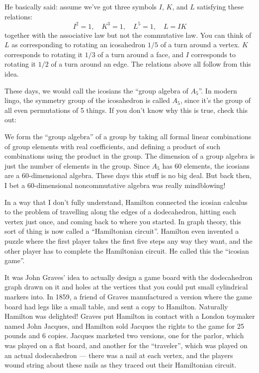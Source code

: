 \documentclass{article}
\def\tightlist{}
\renewcommand{\texttt}[1]{%
  \begingroup
  \ttfamily
  \begingroup\lccode`~=`/\lowercase{\endgroup\def~}{/\discretionary{}{}{}}%
  \begingroup\lccode`~=`[\lowercase{\endgroup\def~}{[\discretionary{}{}{}}%
  \begingroup\lccode`~=`.\lowercase{\endgroup\def~}{.\discretionary{}{}{}}%
  \catcode`/=\active\catcode`[=\active\catcode`.=\active
  \scantokens{#1\noexpand}%
  \endgroup
}
\begin{document}
He basically said: assume we've got three symbols \(I\), \(K\), and
\(L\) satisfying these relations:
\[I^2 = 1,\quad K^3 = 1,\quad L^5 = 1,\quad L = IK \] together with the
associative law but not the commutative law. You can think of \(L\) as
corresponding to rotating an icosahedron \(1/5\) of a turn around a
vertex. \(K\) corresponds to rotating it \(1/3\) of a turn around a
face, and \(I\) corresponds to rotating it \(1/2\) of a turn around an
edge. The relations above all follow from this idea.

These days, we would call the icosians the ``group algebra of \(A_5\)''.
In modern lingo, the symmetry group of the icosahedron is called
\(A_5\), since it's the group of all even permutations of 5 things. If
you don't know why this is true, check this out:


We form the ``group algebra'' of a group by taking all formal linear
combinations of group elements with real coefficients, and defining a
product of such combinations using the product in the group. The
dimension of a group algebra is just the number of elements in the
group. Since \(A_5\) has 60 elements, the icosians are a 60-dimensional
algebra. These days this stuff is no big deal. But back then, I bet a
60-dimensional noncommutative algebra was really mindblowing!

In a way that I don't fully understand, Hamilton connected the icosian
calculus to the problem of travelling along the edges of a dodecahedron,
hitting each vertex just once, and coming back to where you started. In
graph theory, this sort of thing is now called a ``Hamiltonian
circuit''. Hamilton even invented a puzzle where the first player takes
the first five steps any way they want, and the other player has to
complete the Hamiltonian circuit. He called this the ``icosian game''.

It was John Graves' idea to actually design a game board with the
dodecahedron graph drawn on it and holes at the vertices that you could
put small cylindrical markers into. In 1859, a friend of Graves
manufactured a version where the game board had legs like a small table,
and sent a copy to Hamilton. Naturally Hamilton was delighted! Graves
put Hamilton in contact with a London toymaker named John Jacques, and
Hamilton sold Jacques the rights to the game for 25 pounds and 6 copies.
Jacques marketed two versions, one for the parlor, which was played on a
flat board, and another for the ``traveler'', which was played on an
actual dodecahedron --- there was a nail at each vertex, and the players
wound string about these nails as they traced out their Hamiltonian
circuit.
\end{document}
